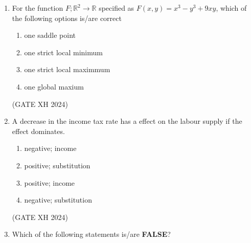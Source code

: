 \documentclass{article}
\begin{document}
\begin{enumerate}
    \begin{multicols}{2}
    \begin{enumerate}
        \item enter; accommodate
        \item enter; fight
        \item not enter; accommodate
        \item not enter; fight 
    \end{enumerate}
    \end{multicols} \hfill (GATE XH 2024)

    \item For the function $F;\mathbb{R}^2\rightarrow\mathbb{R}$ specified as $F(x,y)=x^3-y^3+9xy$, which of the following options is/are correct

    \begin{multicols}{2}
    \begin{enumerate}
        \item one saddle point 
        \item one strict local minimum
        \item one strict local maximmum
        \item one global maxium
    \end{enumerate}
    \end{multicols} \hfill (GATE XH 2024)

    \item A decrease in the income tax rate has a \makebox[1cm]{\hrulefill} effect on the labour supply if the \makebox[1cm]{\hrulefill} effect dominates.

    \begin{multicols}{2}
    \begin{enumerate}
        \item negative; income
        \item positive; substitution
        \item positive; income
        \item negative; substitution
    \end{enumerate}
    \end{multicols} \hfill (GATE XH 2024)

    \item Which of the following statements is/are \textbf{FALSE}?


\end{enumerate}
\end{document}
